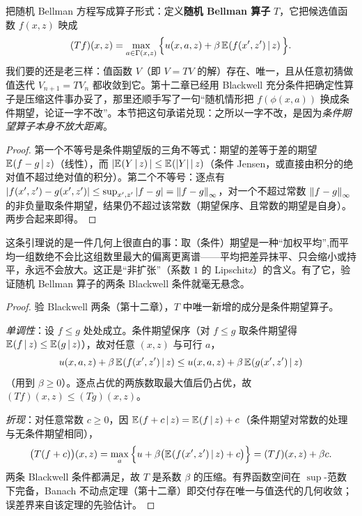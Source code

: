 把随机 Bellman 方程写成算子形式：定义\textbf{随机 Bellman 算子} $T$，它把候选值函数 $f(x,z)$ 映成
\[
    (Tf)(x,z)=\max_{a\in\Gamma(x,z)}\Big\{u(x,a,z)+\beta\,\E{f(x',z')\given z}\Big\}.
\]
我们要的还是老三样：值函数 $V$（即 $V=TV$ 的解）存在、唯一，且从任意初猜做值迭代 $V_{n+1}=TV_n$ 都收敛到它。第十二章已经用 Blackwell 充分条件把确定性算子是压缩这件事办妥了，那里还顺手写了一句``随机情形把 $f(\phi(x,a))$ 换成条件期望，论证一字不改''。本节把这句承诺兑现：之所以一字不改，是因为\emph{条件期望算子本身不放大距离}。


\begin{proof}
第一个不等号是条件期望版的三角不等式：期望的差等于差的期望 $\E{f-g\given z}$（线性），而 $|\E{Y\given z}|\le\E{|Y|\given z}$（条件 Jensen，或直接由积分的绝对值不超过绝对值的积分）。第二个不等号：逐点有 $|f(x',z')-g(x',z')|\le\sup_{x',z'}|f-g|=\norm[\infty]{f-g}$，对一个不超过常数 $\norm[\infty]{f-g}$ 的非负量取条件期望，结果仍不超过该常数（期望保序、且常数的期望是自身）。两步合起来即得。
\end{proof}

这条引理说的是一件几何上很直白的事：取（条件）期望是一种``加权平均'',而平均一组数绝不会比这组数里最大的偏离更离谱——平均把差异抹平、只会缩小或持平，永远不会放大。这正是``非扩张''（系数 $1$ 的 Lipschitz）的含义。有了它，验证随机 Bellman 算子的两条 Blackwell 条件就毫无悬念。


\begin{proof}
验 Blackwell 两条（第十二章），$T$ 中唯一新增的成分是条件期望算子。

\emph{单调性}：设 $f\le g$ 处处成立。条件期望保序（对 $f\le g$ 取条件期望得 $\E{f\given z}\le\E{g\given z}$），故对任意 $(x,z)$ 与可行 $a$，
\[
    u(x,a,z)+\beta\,\E{f(x',z')\given z}\le u(x,a,z)+\beta\,\E{g(x',z')\given z}
\]
（用到 $\beta\ge 0$）。逐点占优的两族数取最大值后仍占优，故 $(Tf)(x,z)\le(Tg)(x,z)$。

\emph{折现}：对任意常数 $c\ge 0$，因 $\E{f+c\given z}=\E{f\given z}+c$（条件期望对常数的处理与无条件期望相同），
\[
    \big(T(f+c)\big)(x,z)
    =\max_a\Big\{u+\beta\big(\E{f(x',z')\given z}+c\big)\Big\}
    =(Tf)(x,z)+\beta c .
\]
两条 Blackwell 条件都满足，故 $T$ 是系数 $\beta$ 的压缩。有界函数空间在 $\sup$-范数下完备，Banach 不动点定理（第十二章）即交付存在唯一与值迭代的几何收敛；误差界来自该定理的先验估计。
\end{proof}


